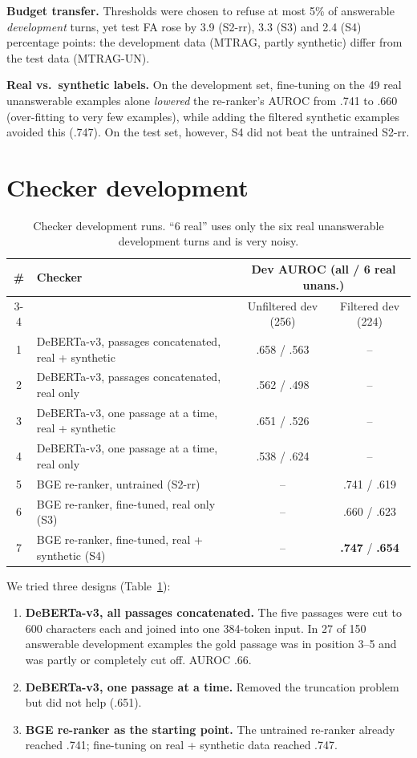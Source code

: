 \documentclass[11pt,a4paper]{report}
\newcommand{\sys}[1]{\textsf{#1}}
\begin{document}
\textbf{Budget transfer.} Thresholds were chosen to refuse at most 5\% of answerable \emph{development} turns, yet test FA rose by 3.9 (\sys{S2-rr}), 3.3 (\sys{S3}) and 2.4 (\sys{S4}) percentage points: the development data (MTRAG, partly synthetic) differ from the test data (MTRAG-UN).

\textbf{Real vs.\ synthetic labels.} On the development set, fine-tuning on the 49 real unanswerable examples alone \emph{lowered} the re-ranker's AUROC from .741 to .660 (over-fitting to very few examples), while adding the filtered synthetic examples avoided this (.747). On the test set, however, \sys{S4} did not beat the untrained \sys{S2-rr}.

\section{Checker development}\label{sec:checkerdev}
\begin{table}[H]
\centering\small
\begin{tabular}{@{}clcc@{}}
\toprule
\# & Checker & \multicolumn{2}{c}{Dev AUROC (all / 6 real unans.)} \\
\cmidrule(lr){3-4}
& & Unfiltered dev (256) & Filtered dev (224) \\
\midrule
1 & DeBERTa-v3, passages concatenated, real + synthetic & .658 / .563 & -- \\
2 & DeBERTa-v3, passages concatenated, real only & .562 / .498 & -- \\
3 & DeBERTa-v3, one passage at a time, real + synthetic & .651 / .526 & -- \\
4 & DeBERTa-v3, one passage at a time, real only & .538 / .624 & -- \\
5 & BGE re-ranker, untrained (\sys{S2-rr}) & -- & .741 / .619 \\
6 & BGE re-ranker, fine-tuned, real only (\sys{S3}) & -- & .660 / .623 \\
7 & BGE re-ranker, fine-tuned, real + synthetic (\sys{S4}) & -- & \textbf{.747} / \textbf{.654} \\
\bottomrule
\end{tabular}
\caption{Checker development runs. ``6 real'' uses only the six real unanswerable development turns and is very noisy.}
\label{tab:checker}
\end{table}
We tried three designs (Table~\ref{tab:checker}):
\begin{enumerate}
\item \textbf{DeBERTa-v3, all passages concatenated.} The five passages were cut to 600 characters each and joined into one 384-token input. In 27 of 150 answerable development examples the gold passage was in position 3--5 and was partly or completely cut off. AUROC .66.
\item \textbf{DeBERTa-v3, one passage at a time.} Removed the truncation problem but did not help (.651).
\item \textbf{BGE re-ranker as the starting point.} The untrained re-ranker already reached .741; fine-tuning on real + synthetic data reached .747.
\end{enumerate}
\end{document}

